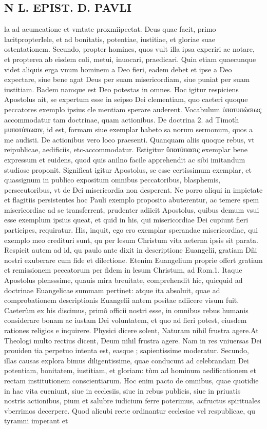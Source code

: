 \documentclass{article}
\begin{document}
\begin{pages}
\section*{N L. EPIST. D. PAVLI }
\marginpar{[ p.56 ]}\pstart la ad aeumcatione et vmtate proxmiipectat. Deus quae facit, primo lacitpropterIele, et ad bonitatis, potentiae, iustitiae, et gloriae suae ostentationem. Secundo, propter homines, quos vult illa ipsa experiri ac notare, et propterea ab eisdem coli, metui, inuocari, praedicari. Quin etiam quaecunque  videt aliquis erga vnum hominem a Deo fieri, eadem debet et ipse a Deo expectare, siue bene agat Deus per suam misericordiam, siue puniat per suam iustitiam. Badem namque  est Deo potestas in omnes. Hoc igitur respiciens Apostolus ait, se expertum esse in seipso Dei clementiam, quo caeteri quoque  peccatores exemplo ipsius cle mentiam sperare auderent. Vocabulum ὐποτυπώσιως accommodatur tam doctrinae, quam actionibus. De doctrina 2. ad Timoth μυποτύπωαιν, id est, formam siue exemplar habeto sa norum sermonum, quos a me audisti. De actionibus vero loco praesenti. Quanquam aliis quoque  rebus, vt reipublicae, aedificiis, etc-accommodatur. Estigitur ὕποτύπασις exemplar bene expressum et euidens, quod quis anilno facile apprehendit ac sibi imitandum studiose proponit. Significat igitur Apostolus, se esse certissimum exemplar, et quassignum in publico expositum omnibus peccatoribus, blasphemis, persecutoribus, vt de Dei misericordia non desperent. Ne porro aliqui in impietate et flagitiis persistentes hoc Pauli exemplo proposito abuterentur, ac temere spem misericordiae ad se transferrent, prudenter adiicit Apostolus, quibus demum vsui esse exemplum ipsius queat, et quid in his, qui misericordiae Dei cupiunt fieri participes, requiratur. His, inquit, ego ero exemplar sperandae misericordiae, qui exemplo meo credituri sunt, qu per lesum Christum vita aeterna ipsis sit parata. Respicit autem ad id, qu paulo ante dixit in descriptione Euangelii, gratiam Dñi nostri exuberare cum fide et dilectione. Etenim Euangelium proprie offert gratiam et remissionem peccatorum per fidem in lesum Christum, ad Rom.1. Itaque  Apostolus plensssime, quauis mira breuitate, comprehendit hic, quicquid ad doctrinae Euangelicae summam pertinet: atque  ita absoluit, quae ad comprobationem descriptionis Euangelii antem positae adiicere visum fuit. Caeterùm ex his discimus, primô officii nostri esse, in omnibus rebus humanis considerare bonam ac iustam Dei voluntatem, et quo ad fieri potest, eiusdem rationes religios e inquirere. Physici dicere solent, Naturam nihil frustra agere.At Theologi multo rectius dicent, Deum nihil frustra agere. Nam in res vniuersas Dei prouiden tia perpetuo intenta est, easque ; sapientissime moderatur. Secundo, illas causas explora bimus diligentissime, quae conducunt ad celebrandam Dei potentiam, bonitatem, iustitiam, et gloriam: tùm ad hominum aedificationem et rectam institutionem conscientiarum. Hoc enim pacto de omnibus, quae quotidie in hac vita eueniunt, siue in ecclesiis, siue in rebus publicis, siue in priuatis nostris actionibus, pium et salubre iudicium ferre poterimus, acfructus spirituales vberrimos decerpere. Quod alicubi recte ordinantur ecclesiae vel respublicae, qu tyramni imperant et 
\end{pages}
\end{document}
